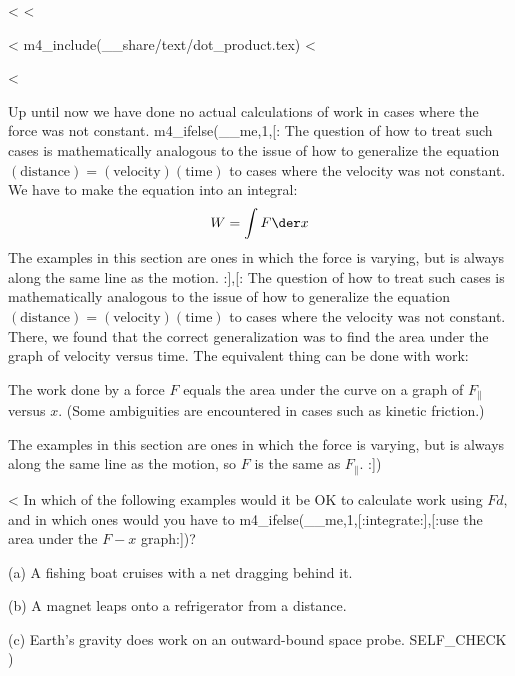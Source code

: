   <%
<%

<%
  m4_include(__share/text/dot_product.tex)
<%

<%

Up until now we have done no actual calculations of work in
cases where the force was not constant. 
m4_ifelse(__me,1,[:%
The question of how
to treat such cases is mathematically analogous to the issue
of how to generalize the equation 
$(\text{distance})=(\text{velocity})(\text{time})$
to cases where the velocity was not constant. We have to make
the equation into an integral:
\begin{equation*}
  W = \int F \der x
\end{equation*}
The examples in this section are ones in which the force is
varying, but is always along the same line as the motion.
:],[:%
The question of how
to treat such cases is mathematically analogous to the issue
of how to generalize the equation 
$(\text{distance})=(\text{velocity})(\text{time})$
to cases where the velocity was not constant. There, we
found that the correct generalization was to find the area
under the graph of velocity versus time. The equivalent
thing can be done with work:

\begin{lessimportant}
The work done by a force $F$ equals the area under the curve
on a graph of $F_{\parallel}$ versus $x$. (Some ambiguities are
encountered in cases such as kinetic friction.)
\end{lessimportant}
The examples in this section are ones in which the force is
varying, but is always along the same line as the motion, so
$F$ is the same as $F_{\parallel}$.
:])

<%
In which of the following examples would it be OK to
calculate work using $Fd$, and in which ones would you
have to m4_ifelse(__me,1,[:integrate:],[:use the area under the $F-x$ graph:])?

(a) A fishing boat cruises with a net dragging behind it.

(b) A magnet leaps onto a refrigerator from a distance.

(c) Earth's gravity does work on an outward-bound space probe.
  SELF_CHECK
  ) %

